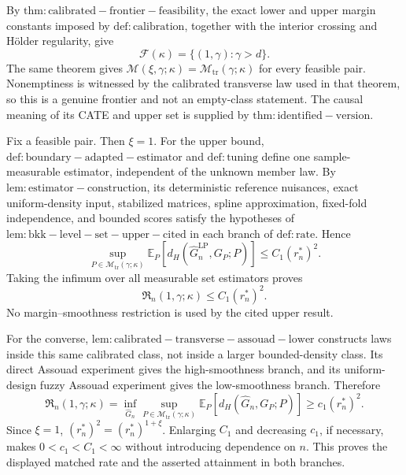 By \(\mathrm{thm:calibrated-frontier-feasibility}\), the exact lower and upper margin constants imposed by \(\mathrm{def:calibration}\), together with the interior crossing and Hölder regularity, give
\[
\mathcal F(\kappa)=\{(1,\gamma):\gamma>d\}.
\]
The same theorem gives \(\mathcal M(\xi,\gamma;\kappa)=\mathcal M_{\mathrm{tr}}(\gamma;\kappa)\) for every feasible pair. Nonemptiness is witnessed by the calibrated transverse law used in that theorem, so this is a genuine frontier and not an empty-class statement. The causal meaning of its CATE and upper set is supplied by \(\mathrm{thm:identified-version}\).

Fix a feasible pair. Then \(\xi=1\). For the upper bound, \(\mathrm{def:boundary-adapted-estimator}\) and \(\mathrm{def:tuning}\) define one sample-measurable estimator, independent of the unknown member law. By \(\mathrm{lem:estimator-construction}\), its deterministic reference nuisances, exact uniform-density input, stabilized matrices, spline approximation, fixed-fold independence, and bounded scores satisfy the hypotheses of \(\mathrm{lem:bkk-level-set-upper-cited}\) in each branch of \(\mathrm{def:rate}\). Hence
\[
\sup_{P\in\mathcal M_{\mathrm{tr}}(\gamma;\kappa)}
\mathbb E_P\!\left[d_H(\widehat G_n^{\mathrm{LP}},G_P;P)\right]
\le C_1(r_n^*)^2.
\]
Taking the infimum over all measurable set estimators proves
\[
\mathfrak R_n(1,\gamma;\kappa)\le C_1(r_n^*)^2.
\]
No margin--smoothness restriction is used by the cited upper result.

For the converse, \(\mathrm{lem:calibrated-transverse-assouad-lower}\) constructs laws inside this same calibrated class, not inside a larger bounded-density class. Its direct Assouad experiment gives the high-smoothness branch, and its uniform-design fuzzy Assouad experiment gives the low-smoothness branch. Therefore
\[
\mathfrak R_n(1,\gamma;\kappa)
=\inf_{\widehat G_n}\sup_{P\in\mathcal M_{\mathrm{tr}}(\gamma;\kappa)}
\mathbb E_P\!\left[d_H(\widehat G_n,G_P;P)\right]
\ge c_1(r_n^*)^2.
\]
Since \(\xi=1\), \((r_n^*)^2=(r_n^*)^{1+\xi}\). Enlarging \(C_1\) and decreasing \(c_1\), if necessary, makes \(0<c_1<C_1<\infty\) without introducing dependence on \(n\). This proves the displayed matched rate and the asserted attainment in both branches.